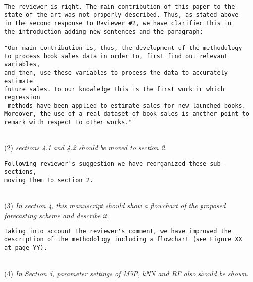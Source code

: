 \documentclass[preprint]{elsarticle}
\begin{document}
\begin{verbatim}

The reviewer is right. The main contribution of this paper to the 
state of the art was not properly described. Thus, as stated above 
in the second response to Reviewer #2, we have clarified this in 
the introduction adding new sentences and the paragraph:

"Our main contribution is, thus, the development of the methodology 
to process book sales data in order to, first find out relevant variables, 
and then, use these variables to process the data to accurately estimate 
future sales. To our knowledge this is the first work in which regression
 methods have been applied to estimate sales for new launched books. 
Moreover, the use of a real dataset of book sales is another point to 
remark with respect to other works."

\end{verbatim}

~\\
\noindent (2) \emph{sections 4.1 and 4.2 should be moved to section 2. } 

\begin{verbatim}
Following reviewer's suggestion we have reorganized these sub-sections, 
moving them to section 2.
\end{verbatim}


~\\
\noindent (3) \emph{In section 4, this manuscript should show a flowchart of the proposed forecasting scheme and describe it. } 

\begin{verbatim}
Taking into account the reviewer's comment, we have improved the 
description of the methodology including a flowchart (see Figure XX 
at page YY).
\end{verbatim}


~\\
\noindent (4) \emph{In Section 5, parameter settings of 
M5P, kNN and RF also should be shown. } 
\end{document}
